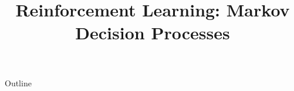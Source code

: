 \documentclass[xcolor=dvipsnames,compress,t,pdf,9pt]{beamer}
\title[\insertframenumber /\inserttotalframenumber]{Reinforcement Learning: Markov Decision Processes}
\begin{document}
	\begin{frame}
	\titlepage
	\end{frame}

	\begin{frame}{Outline}
	    \tableofcontents
	\end{frame}

	
	
	
\end{document}
